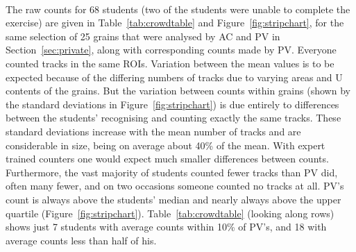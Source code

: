 \documentclass[gchron, manuscript]{copernicus}
\begin{document}
\begin{small}
  \\
\end{small}
\label{tab:crowdtable}

The raw counts for 68 students (two of the students were unable to
complete the exercise) are given in Table~\ref{tab:crowdtable} and
Figure~\ref{fig:stripchart}, for the same selection of 25 grains that
were analysed by AC and PV in Section~\ref{sec:private}, along with
corresponding counts made by PV. Everyone counted tracks in the same
ROIs. Variation between the mean values is to be expected because of
the differing numbers of tracks due to varying areas and U contents of
the grains. But the variation between counts within grains (shown by
the standard deviations in Figure~\ref{fig:stripchart}) is due
entirely to differences between the students' recognising and counting
exactly the same tracks. These standard deviations increase with the
mean number of tracks and are considerable in size, being on average
about 40\% of the mean. With expert trained counters one would expect
much smaller differences between counts.  Furthermore, the vast
majority of students counted fewer tracks than PV did, often many
fewer, and on two occasions someone counted no tracks at all. PV's
count is always above the students' median and nearly always above the
upper quartile (Figure~\ref{fig:stripchart}).
Table~\ref{tab:crowdtable} (looking along rows) shows just 7 students
with average counts within 10\% of PV's, and 18 with average counts
less than half of his.\medskip
\end{document}

